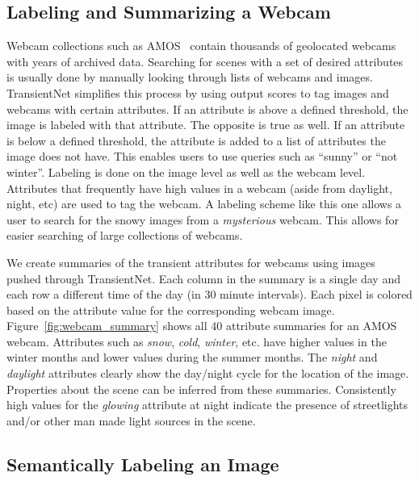\documentclass[10pt,twocolumn,letterpaper]{article}
\newcommand{\figref}[1]{Figure~\ref{fig:#1}}
\begin{document}
\subsection{Labeling and Summarizing a Webcam}

Webcam collections such as AMOS~\cite{jacobs07amos} contain thousands of
geolocated webcams with years of archived data.  Searching for scenes with a
set of desired attributes is usually done by manually looking through lists of
webcams and images.  TransientNet simplifies this process by using output
scores to tag images and webcams with certain attributes.  If an attribute is
above a defined threshold, the image is labeled with that attribute.  The
opposite is true as well.  If an attribute is below a defined threshold, the
attribute is added to a list of attributes the image does not have.  This
enables users to use queries such as ``sunny'' or ``not winter''.  Labeling is
done on the image level as well as the webcam level.  Attributes that
frequently have high values in a webcam (aside from daylight, night, etc) are
used to tag the webcam.  A labeling scheme like this one allows a user to
search for the snowy images from a \textit{mysterious} webcam. This allows for
easier searching of large collections of webcams.

We create summaries of the transient attributes for webcams using images pushed
through TransientNet.  Each column in the summary is a single day and each row
a different time of the day (in 30 minute intervals).  Each pixel is colored
based on the attribute value for the corresponding webcam image.
\figref{webcam_summary} shows all 40 attribute summaries for an AMOS webcam.
Attributes such as \textit{snow}, \textit{cold}, \textit{winter}, etc. have
higher values in the winter months and lower values during the summer months.
The \textit{night} and \textit{daylight} attributes clearly show the day/night
cycle for the location of the image.  Properties about the scene can be
inferred from these summaries.  Consistently high values for the
\textit{glowing} attribute at night indicate the presence of streetlights
and/or other man made light sources in the scene.

\subsection{Semantically Labeling an Image}
\end{document}
